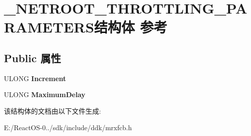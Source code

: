 \hypertarget{struct___n_e_t_r_o_o_t___t_h_r_o_t_t_l_i_n_g___p_a_r_a_m_e_t_e_r_s}{}\section{\+\_\+\+N\+E\+T\+R\+O\+O\+T\+\_\+\+T\+H\+R\+O\+T\+T\+L\+I\+N\+G\+\_\+\+P\+A\+R\+A\+M\+E\+T\+E\+R\+S结构体 参考}
\label{struct___n_e_t_r_o_o_t___t_h_r_o_t_t_l_i_n_g___p_a_r_a_m_e_t_e_r_s}
\subsection*{Public 属性}
\begin{DoxyCompactItemize}
\item 
\mbox{\label{struct___n_e_t_r_o_o_t___t_h_r_o_t_t_l_i_n_g___p_a_r_a_m_e_t_e_r_s_ae1a77a2793510d2e4f043ebebdcfb8d9}} 
U\+L\+O\+NG {\bfseries Increment}
\item 
\mbox{\label{struct___n_e_t_r_o_o_t___t_h_r_o_t_t_l_i_n_g___p_a_r_a_m_e_t_e_r_s_ac32529255015079182e0ee3034f774c2}} 
U\+L\+O\+NG {\bfseries Maximum\+Delay}
\end{DoxyCompactItemize}


该结构体的文档由以下文件生成\+:\begin{DoxyCompactItemize}
\item 
E\+:/\+React\+O\+S-\/0../sdk/include/ddk/mrxfcb.\+h\end{DoxyCompactItemize}
